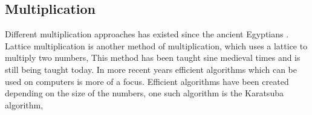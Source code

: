 
\subsection{Multiplication} 
Different multiplication approaches has existed since the ancient Egyptians \cite{ancientmult}. Lattice multiplication is another method of multiplication, which uses a lattice to multiply two numbers, This method has been taught sine medieval times and is still being taught today. In more recent years efficient algorithms which can be used on computers is more of a focus. Efficient algorithms have been created depending on the size of the numbers, one such algorithm is the Karatsuba algorithm,

